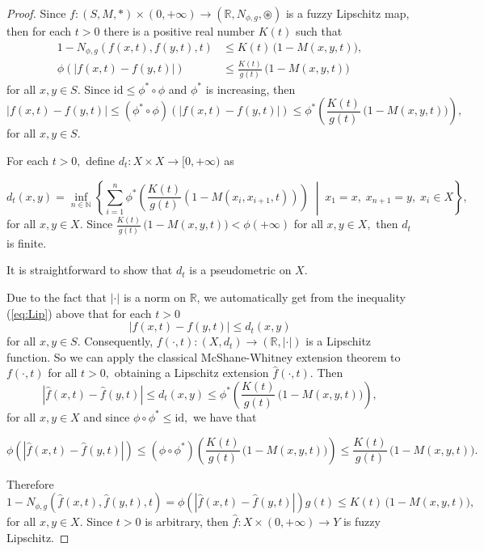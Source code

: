 \documentclass[10pt,a4paper]{amsart}
\begin{document}
	\begin{proof}
		Since $f:(S,M,\ast) \times (0,+\infty) \to  (\mathbb R, N_{\phi,g}, \circledast)
		$ is a fuzzy Lipschitz map, then for each $t>0$
		there is a positive real number $K(t)$ such that
		\begin{align*}
			1- N_{\phi,g}(f(x,t),f(y,t),t) & \le K(t) \, \Big( 1- M(x,y,t) \Big),\\
			\phi(|f(x,t)-f(y,t)|) &\le \frac{K(t)}{g(t)} \, \Big( 1- M(x,y,t) \Big)
		\end{align*}
		for all $x,y\in S.$  Since  $\mathrm{id}\leq \phi^*\circ \phi$ and $\phi^*$ is increasing, then
		\begin{equation}
			|f(x,t)-f(y,t)| \le (\phi^*\circ\phi)(|f(x,t)-f(y,t)| )\le \phi^{*} \left( \frac{K(t)}{g(t)} \, \big( 1- M(x,y,t) \big) \right)\!,	\label{eq:Lip}
		\end{equation}
		for all $x, y \in S.$ 
		
		For each $t>0,$ define $d_t:X\times X\to [0,+\infty)$ as
		
		$$
		d_t(x,y)=\inf_{n\in\mathbb{N}} \left\{ \sum_{i=1}^n \phi^{*}\left( \frac{K(t)}{g(t)} (1 - M(x_i,x_{i+1},t)) \right) \;\middle|\; x_1{=}x,\; x_{n+1}{=}y,\; x_i \in X \right\}\!,
		$$
		for all $x,y\in X$. Since $\frac{K(t)}{g(t)} \, \big( 1- M(x,y,t) \big)< \phi(+\infty)$
		for all $x,y\in X,$ then $d_t$ is finite. 
		
		It is straightforward to show that $d_t$ is a pseudometric on $X.$
		
		Due to the fact that $|\cdot|$ is a norm on $\mathbb{R}$, we automatically get from the inequality (\ref{eq:Lip}) above that for each $t>0$
		$$|f(x, t)-f(y, t)|\leq d_t(x,y)$$
		for all $x,y\in S.$ Consequently, $f(\cdot,t):(X,d_t)\to (\mathbb{R},|\cdot|)$ is a Lipschitz function. So we can apply the classical McShane-Whitney extension theorem to $f(\cdot,t)$ for all $t>0,$ obtaining a Lipschitz extension $\hat f(\cdot, t)$. Then 
		\[
		|\hat f(x,t)- \hat f(y,t)| \le d_{t}(x,y)\leq \phi^{*} \left(\frac{K(t)}{g(t)} \, \big( 1- M(x,y,t) \big) \right)\!,
		\]
		for all $x,y\in X$ and since $\phi \circ \phi^* \leq \mathrm{id},$ we have that
		
		\[
		\phi(|\hat f(x,t)- \hat f(y,t)|) \le (\phi\circ \phi^{*}) \left(\frac{K(t)}{g(t)} \, \big( 1- M(x,y,t) \big) \right)\le \frac{K(t)}{g(t)} \, \big( 1- M(x,y,t)\big).
		\]
		
		Therefore
		\[
		1- N_{\phi,g} (\hat f(x,t), \hat f(y,t),t) = \phi(|\hat f(x,t)-\hat f(y,t)|) g(t) \le K(t) \, \big( 1- M(x,y,t) \big),
		\]
		for all $x,y\in X.$ Since $t>0$ is arbitrary, then $\hat f:X\times (0,+\infty)\to Y$ is fuzzy Lipschitz.
	\end{proof}
\end{document}
